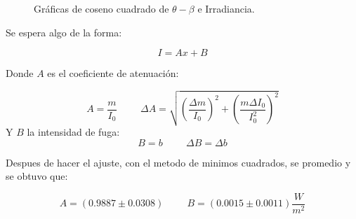 \documentclass[DIV=calc, paper=a4, fontsize=10pt]{scrartcl}
\begin{document}
\begin{figure}[H]
 \centering
 \caption{Gráficas de coseno cuadrado de $\theta - \beta$ e Irradiancia.}
 \label{f:animales}
\end{figure}

Se espera algo de la forma:

\begin{equation*}
    I = A x + B
\end{equation*}

Donde $A$ es el coeficiente de atenuación:

\begin{equation*}
    A = \frac{m}{I_0} \hspace{1cm} \Delta A = \sqrt{\left(\frac{\Delta m}{I_{0}}\right)^{2} + \left(\frac{m\Delta I_0}{I_{0}^{2}}\right)^2}
\end{equation*}
Y $B$ la intensidad de fuga:
\begin{equation*}
    B=b \hspace{1cm} \Delta B = \Delta b
\end{equation*}

Despues de hacer el ajuste, con el metodo de minimos cuadrados, se promedio y se obtuvo que:

\begin{equation*}
    A= (0.9887 \pm 0.0308) \hspace{1cm} B= (0.0015 \pm 0.0011) \frac{W}{m^{2}}
\end{equation*}
\end{document}

